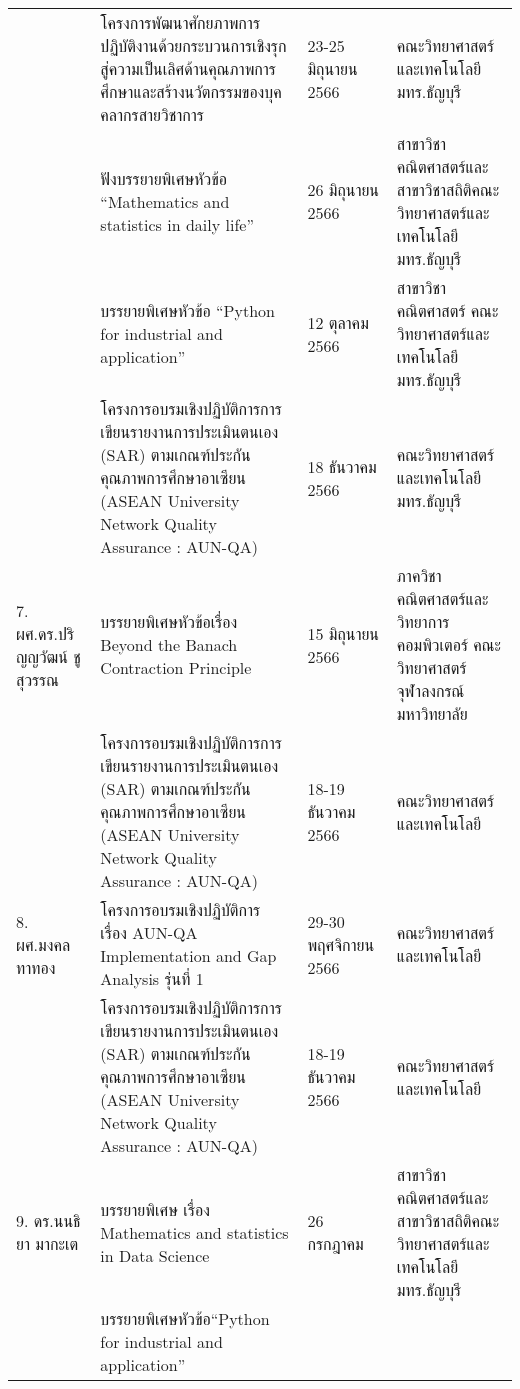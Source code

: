 \begin{longtable}{|p{}|>{\raggedright}p{}|>{\raggedright}p{}|p{}|}
&โครงการพัฒนาศักยภาพการปฏิบัติงานด้วยกระบวนการเชิงรุกสู่ความเป็นเลิศด้านคุณภาพการศึกษาและสร้างนวัตกรรมของ\newline บุคคลากรสายวิชาการ	&23-25 มิถุนายน 2566	
&คณะวิทยาศาสตร์และเทคโนโลยี มทร.ธัญบุรี\\             
\cline{2-4} &ฟังบรรยายพิเศษหัวข้อ “Mathematics and statistics in daily life”	
&26 มิถุนายน 2566	
&สาขาวิชาคณิตศาสตร์และสาขาวิชาสถิติ\newline คณะวิทยาศาสตร์และเทคโนโลยี มทร.ธัญบุรี\\
\cline{2-4}
 &บรรยายพิเศษหัวข้อ “Python for industrial and application”	
&12 ตุลาคม 2566	
&สาขาวิชาคณิตศาสตร์ คณะวิทยาศาสตร์และเทคโนโลยี มทร.ธัญบุรี\\             
\hline
 &โครงการอบรมเชิงปฏิบัติการ\newline การเขียนรายงานการประเมินตนเอง (SAR) ตามเกณฑ์ประกันคุณภาพการศึกษาอาเซียน (ASEAN University Network Quality Assurance : AUN-QA)
&18 ธันวาคม 2566	
&คณะวิทยาศาสตร์และเทคโนโลยี มทร.ธัญบุรี\\ 
\hline 
7. ผศ.ดร.ปริญญวัฒน์ 
ชูสุวรรณ	
&บรรยายพิเศษหัวข้อเรื่อง Beyond the Banach Contraction Principle& 15 มิถุนายน 2566 &ภาควิชาคณิตศาสตร์และวิทยาการคอมพิวเตอร์ คณะวิทยาศาสตร์ จุฬาลงกรณ์มหาวิทยาลัย\\
\cline{2-4}
&โครงการอบรมเชิงปฏิบัติการ\newline การเขียนรายงานการประเมินตนเอง (SAR) ตามเกณฑ์ประกันคุณภาพการศึกษาอาเซียน (ASEAN University Network Quality Assurance : AUN-QA)
&18-19 ธันวาคม 2566	
&คณะวิทยาศาสตร์และเทคโนโลยี\\
\hline
8. ผศ.มงคล ทาทอง
&โครงการอบรมเชิงปฏิบัติการ เรื่อง AUN-QA Implementation and Gap Analysis รุ่นที่ 1	
&29-30 พฤศจิกายน 2566
&คณะวิทยาศาสตร์และเทคโนโลยี\\ 
\cline{2-4}
&โครงการอบรมเชิงปฏิบัติการ\newline การเขียนรายงานการประเมินตนเอง (SAR) ตามเกณฑ์ประกันคุณภาพการศึกษาอาเซียน (ASEAN University Network Quality Assurance : AUN-QA)
&18-19 ธันวาคม 2566
&คณะวิทยาศาสตร์และเทคโนโลยี\\
\hline
9. ดร.นนธิยา มากะเต&บรรยายพิเศษ เรื่อง Mathematics and statistics in Data Science
& 26 กรกฎาคม\newline 2566                  
&สาขาวิชาคณิตศาสตร์และสาขาวิชาสถิติ\newline คณะวิทยาศาสตร์และเทคโนโลยี มทร.ธัญบุรี\\
\cline{2-4} 
&บรรยายพิเศษหัวข้อ\newline “Python for industrial and application”	

\end{longtable}
